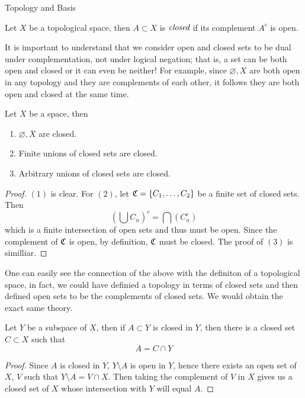 \begin{chapter}{Topology and Basis}
   \begin{defn}
    Let $X$ be a topological space, then $A \subset X$ is $\emph{closed}$ if its complement $A^c$ is open. 
   \end{defn}

   It is important to understand that we consider open and closed sets to be dual under complementation, not under logical negation; that is, a set can be both open and closed or it can even be neither! 
   For example, since $\varnothing, X$ are both open in any topology and they are complements of each other, it follows they are both open and closed at the same time. 


   \begin{thm}
    Let $X$ be a space, then 
    \begin{enumerate}
        \item $\varnothing, X$ are closed. 
        \item Finite unions of closed sets are closed. 
        \item Arbitrary unions of closed sets are closed. 
    \end{enumerate}
   \end{thm}

   \begin{proof}
    $(1)$ is clear. For $(2)$, let $\mathfrak{C} = \{C_1, \dots, C_2\}$ be a finite set of closed sets. Then 
    \[\left(\bigcup C_n \right)^c = \bigcap (C_n^c)\]
    which is a finite intersection of open sets and thus must be open. Since the complement of $\mathfrak{C}$ is open, by definition, $\mathfrak{C}$ must be closed. 
    The proof of $(3)$ is similliar. 
   \end{proof}

   One can easily see the connection of the above with the definiton of a topological space, in fact, we could have definied a topology in terms of closed sets and then defined open sets to be the complements of closed sets. We would obtain the 
   exact same theory. 

   \begin{thm}
    Let $Y$ be a subspace of $X$, then if $A \subset Y$ is closed in $Y$, then there is a closed set $C \subset X$ such that 
    \[A = C \cap Y\]
   \end{thm}

   \begin{proof}
    Since $A$ is closed in $Y$, $Y \setminus A$ is open in $Y$, hence there exists an open set of $X$, $V$ such that $Y \setminus A = V \cap X$. 
    Then taking the complement of $V$ in $X$ gives us a closed set of $X$ whose intersection with $Y$ will equal $A$. 
   \end{proof}


\end{chapter}
